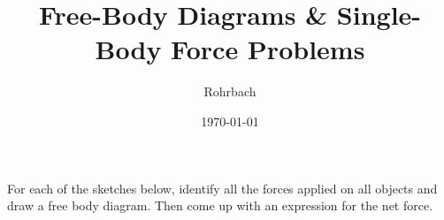 \documentclass[10pt]{exam}
\title{Free-Body Diagrams \& Single-Body Force Problems}
\author{Rohrbach}
\date{\today}
\begin{document}
\maketitle

\begin{questions}

  \question
  For each of the sketches below, identify all the forces applied on all objects and draw a free body diagram.  Then come up with an expression for the net force.

  \newcommand{\picframe}[1]{
    \begin{center}
      \begin{tikzpicture}
        \clip (-3,-3) rectangle (3,3);
        \node at (0,0) {\texttt{[image: \#1]}};
      \end{tikzpicture}
    \end{center}
  }

  \begin{multicols}{2}
\end{multicols}
\end{questions}
\end{document}
